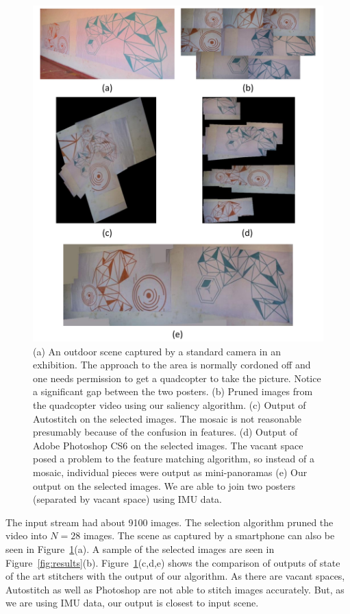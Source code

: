 \documentclass[10pt,twocolumn,letterpaper]{article}
\begin{document}
\begin{figure}[h!]
\centering
\includegraphics[width=0.85\linewidth]{figures/orange_blue.pdf}
\caption{(a) An outdoor scene captured by a standard camera in an
  exhibition. The approach to the area is normally cordoned off and one
  needs permission to get a quadcopter to take the picture.  Notice a
  significant gap between the two posters.  (b) Pruned images from the
  quadcopter video using our saliency algorithm. (c) Output of
  Autostitch on the selected images. The mosaic is not reasonable
  presumably because of the confusion in features. (d) Output of Adobe
  Photoshop CS6 on the selected images. The vacant space posed a
  problem to the feature matching algorithm, so instead of a mosaic,
  individual pieces were output as mini-panoramas (e) Our output on
  the selected images. We are able to join two posters (separated by
  vacant space) using IMU data.}
\label{fig:results1}
\end{figure}

The input stream had about 9100 images. The selection
algorithm pruned the video into $N=28$ images. The scene as captured by a smartphone can also be seen in
Figure~\ref{fig:results1}(a). A sample of the
selected images are seen in Figure~\ref{fig:results}(b).
Figure~\ref{fig:results1}(c,d,e) shows the comparison of outputs of state
of the art stitchers with the output of our algorithm. As there are vacant
spaces, Autostitch as well as Photoshop are not able to stitch images
accurately. But, as we are using IMU data, our output is closest to input scene. 
\end{document}
